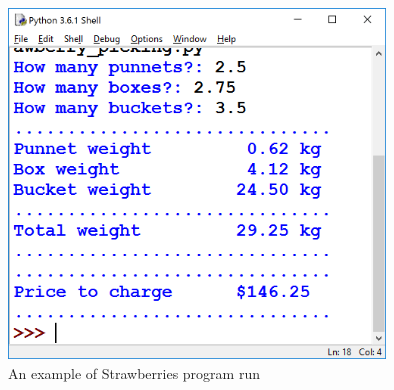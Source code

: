 \documentclass[a4paper,12pt]{article}
\begin{document}
\begin{figure} [!h]
	\centering
	\includegraphics[width=10cm]{screen_shots/strawberries.png}
	\caption*{An example of Strawberries program run}
\end{figure}
\newpage


\newpage
\end{document}
